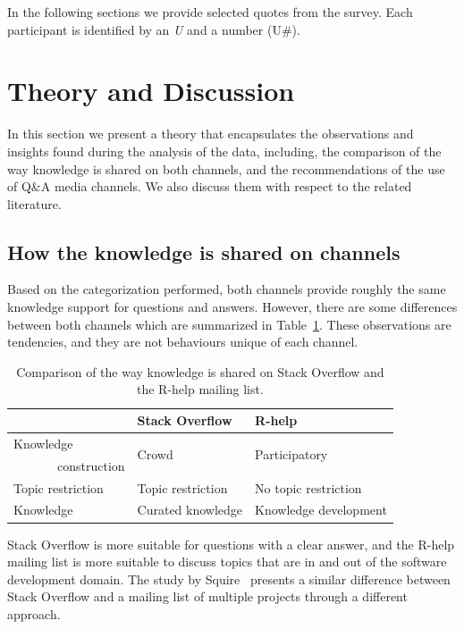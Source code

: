 \documentclass{sig-alternate-05-2015}
\begin{document}
In the following sections we provide selected quotes from the survey.
Each participant is identified by an \emph{U} and a number (U\#).


\section{Theory and Discussion}
\label{cha:theory}

	In this section we present a theory that encapsulates the observations and insights found during the analysis of the data, including, the comparison of the way knowledge is shared on both channels, and the recommendations of the use of Q\&A media channels.
We also discuss them with respect to the related literature.

\subsection{How the knowledge is shared on channels}

	Based on the categorization performed, both channels provide roughly the same knowledge support for questions and answers.
	However, there are some differences between both channels which are summarized in Table~\ref{table:constrat}.
	These observations are tendencies, and they are not behaviours unique of each channel.

    \begin{table}[!htb]
      \centering
	  \caption{Comparison of the way knowledge is shared on Stack Overflow and the R-help mailing list.}
	  \label{table:constrat}
	  \begin{tabular}{@{}lll@{}}
        \toprule
        \textbf{}     & \textbf{Stack Overflow} & \textbf{R-help}\\
        \midrule
        Knowledge              & \multirow{2}{*}{Crowd} & \multirow{2}{*}{Participatory} \\
        ~~~~~~~construction    &                   &  \\
        Topic restriction      & Topic restriction & No topic restriction \\
        Knowledge              & Curated knowledge & Knowledge development\\
        \bottomrule
	  \end{tabular}
	\end{table}

Stack Overflow is more suitable for questions with a clear answer, and the R-help mailing list is more suitable to discuss topics that are in and out of the software development domain.
The study by Squire~\cite{Squire2015a} presents a similar difference between Stack Overflow and a mailing list of multiple projects through a different approach.
\end{document}
